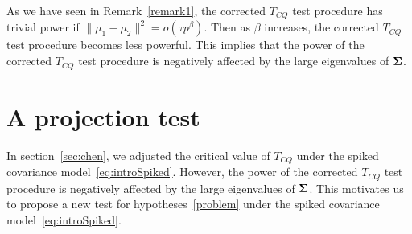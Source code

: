 \documentclass[review]{elsarticle}
\theoremstyle{plain}
\theoremstyle{definition}
\theoremstyle{remark}
\begin{document}
As we have seen in Remark~\ref{remark1}, the corrected $T_{CQ}$ test procedure has trivial power if $\|\mu_1-\mu_2\|^2=o(\tau p^{\beta})$.
Then as $\beta$ increases, the corrected $T_{CQ}$ test procedure becomes less powerful.
This implies that the power of the corrected $T_{CQ}$ test procedure is negatively affected by the large eigenvalues of $\boldsymbol{\Sigma}$.





\section{A projection test}\label{methodology}


In section~\ref{sec:chen}, we adjusted the critical value of $T_{CQ}$ under the spiked covariance model~\eqref{eq:introSpiked}.
However, %
the power of the corrected $T_{CQ}$ test procedure is negatively affected by the large eigenvalues of $\boldsymbol{\Sigma}$.
This motivates us to propose a new test for hypotheses~\eqref{problem} under the spiked covariance model~\eqref{eq:introSpiked}.
\end{document}
